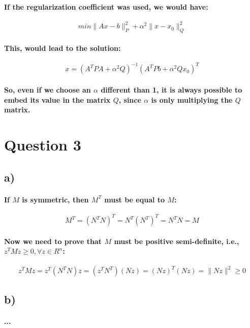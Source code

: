 \documentclass[a4paper]{article}    %
\begin{document}
\paragraph{If the regularization coefficient was used, we would have:}
    \[min\|Ax-b\|_{P}^{2}+\alpha^2\|x-x_{0}\|_{Q}^{2}\]

\paragraph{This, would lead to the solution:}
\[x = (A^TPA + \alpha^2Q)^{-1}(A^TPb + \alpha^2Qx_0)^T\]

\paragraph{So, even if we choose an $\alpha$ different than 1, it is always possible to embed its value in the matrix $Q$, since $\alpha$ is only multiplying the $Q$ matrix.}

\newpage

\section*{Question 3}

\subsection*{a)}

\paragraph{If $M$ is symmetric, then $M^T$ must be equal to $M$:}
    \[M^T = (N^TN)^T = N^T(N^T)^T = N^TN = M\]
\paragraph{Now we need to prove that $M$ must be positive semi-definite, i.e., $z^TMz \geq 0, \forall z \in R^n$:}
    \[z^TMz = z^T(N^TN)z = (z^TN^T)(Nz) = (Nz)^T(Nz) = \|Nz\|^2 \geq 0\]

\subsection*{b)}

\paragraph{...}
\end{document}
